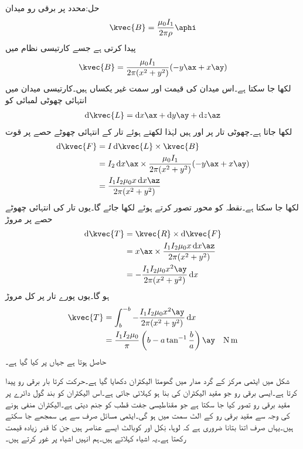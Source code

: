 حل:محدد  پر برقی رو میدان 
\begin{align*}
\kvec{B}=\frac{\mu_0 I_1}{2\pi \rho}\aphi
\end{align*}
پیدا کرتی ہے جسے کارتیسی نظام میں
\begin{align*}
\kvec{B}=\frac{\mu_0 I_1}{2\pi(x^2+y^2)} (-y\ax+x\ay)
\end{align*}
لکھا جا سکتا ہے۔اس میدان کی قیمت اور سمت غیر یکساں ہیں۔کارتیسی میدان میں انتہائی چھوٹی لمبائی کو
\begin{align*}
\dif \kvec{L}=\dif x \ax+\dif y \ay +\dif z \az
\end{align*}
لکھا جاتا ہے۔چھوٹی تار پر  اور  ہیں لہٰذا  لکھتے ہوئے تار کے انتہائی چھوٹے حصے پر قوت
\begin{align*}
\dif \kvec{F}&=I \dif \kvec{L} \times \kvec{B}\\
&=I_2 \dif x \ax \times \frac{\mu_0 I_1}{2\pi(x^2+y^2)} (-y\ax+x\ay)\\
&=\frac{I_1 I_2 \mu_0 x \dif x \az}{2\pi (x^2+y^2)}
\end{align*}
لکھا جا سکتا ہے۔نقطہ  کو محور تصور کرتے ہوئے  لکھا جائے گا۔یوں تار کی انتہائی چھوٹے حصے پر مروڑ
\begin{align*}
\dif \kvec{T}&=\kvec{R} \times \dif \kvec{F}\\
&=x\ax \times \frac{I_1 I_2 \mu_0 x \dif x \az}{2\pi (x^2+y^2)}\\
&=-\frac{I_1 I_2 \mu_0 x^2 \ay}{2\pi (x^2+y^2)} \dif x
\end{align*}
ہو گا۔یوں پورے تار پر کل مروڑ
\begin{align*}
\kvec{T}&=\int_{b}^{-b}-\frac{I_1 I_2 \mu_0 x^2 \ay}{2\pi (x^2+y^2)} \dif x\\
&=\frac{I_1 I_2 \mu_0}{\pi} \left(b-a \tan^{-1} \frac{b}{a}\right)\ay \quad \si{\newton \meter}
\end{align*}
حاصل ہوتا ہے جہاں  پر کیا گیا ہے۔

شکل  میں ایٹمی مرکز کے گرد مدار میں گھومتا الیکٹران دکھایا گیا ہے۔حرکت کرتا بار برقی رو پیدا کرتا ہے۔ایسی برقی رو جو مقید الیکٹران کی بنا ہو    کہلائی جاتی  ہے۔اس الیکٹران کو بند گول دائرے پر مقید برقی رو تصور کیا جا سکتا ہے جو مقناطیسی جفت قطب  کو جنم دیتی ہے۔الیکٹران منفی ہونے کی وجہ سے   مقید برقی  رو   کے الٹ سمت میں ہو گی۔ایٹمی مسائل صرف  سے ہی سمجھے جا سکتے ہیں۔یہاں صرف اتنا بتانا ضروری ہے کہ لوہا، نِکل اور کوبالٹ  ایسے  عناصر ہیں جن کا   قدر زیادہ قیمت رکھتا ہے۔یہ اشیاء  کہلاتے ہیں۔ہم انہیں اشیاء پر غور کرتے ہیں۔

